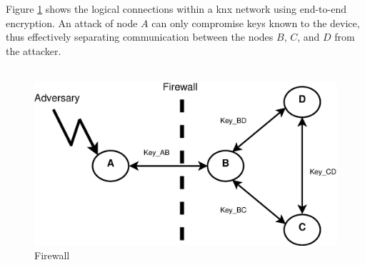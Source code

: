Figure \ref{fig:firewall} shows the logical connections within a \gls{knx} network using end-to-end encryption. An 
attack of node $A$ can only compromise keys known to the device, thus effectively separating communication between the nodes $B$, $C$, and $D$ from
the attacker.
% 
% 
% 
\\
\\
\begin{figure}
  \centering
    \includegraphics[width=1\textwidth]{figures/firewall.eps}
 \caption{Firewall}
 \label{fig:firewall}
\end{figure}
